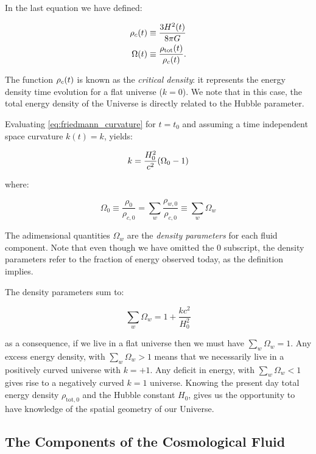 In the last equation we have defined:

\begin{align}
        \rho_c\qty(t) & \equiv \frac{3H^2\qty(t)}{8\pi G} \\
        \Omega\qty(t) & \equiv \frac{\rho_{\text{tot}}\qty(t)}{\rho_c\qty(t)}.
\end{align}

The function $\rho_c\qty(t)$ is known as the \emph{critical density}: it
represents the energy density time evolution for a flat universe ($k = 0$).
We note that in this case, the total energy density of the Universe is
directly related to the Hubble parameter.

Evaluating \autoref{eq:friedmann_curvature} for $t = t_0$ and assuming a
time independent space curvature $k(t) = k$, yields:

\begin{equation}
        k = \frac{H^2_0}{c^2} \qty(\Omega_0 - 1) \\
\end{equation}

where:

\begin{equation}
        \Omega_0 \equiv \frac{\rho_0}{\rho_{c,0}} = \sum_w
        \frac{\rho_{w,0}}{\rho_{c,0}} \equiv \sum_w \Omega_w
\end{equation}

The adimensional quantities $\Omega_w$ are the \emph{density parameters}
for each fluid component. Note that even though we have omitted the $0$
subscript, the density parameters refer to the fraction of energy observed
today, as the definition implies.

The density parameters sum to:

\begin{equation}
        \sum_w \Omega_w = 1 + \frac{kc^2}{H^2_0}
\end{equation}

as a consequence, if we live in a flat universe then we must have $\sum_w
\Omega_w = 1$. Any excess energy density, with $\sum_w \Omega_w > 1$ means
that we necessarily live in a positively curved universe with $k = +1$. Any
deficit in energy, with $\sum_w \Omega_w < 1$ gives rise to a negatively
curved $k = 1$ universe. Knowing the present day total energy density
$\rho_{\text{tot},0}$ and the Hubble constant $H_0$, gives us the
opportunity to have knowledge of the spatial geometry of our Universe.

\subsection{The Components of the Cosmological Fluid}

